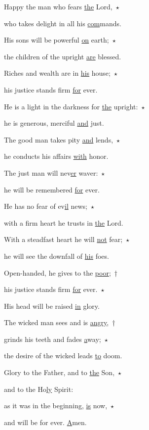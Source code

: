 \noindent Happy the man who fears \uline{the} Lord,~$\star$~\nopagebreak

who takes delight in all his \uline{com}mands.

\noindent His sons will be powerful \uline{on} earth;~$\star$~\nopagebreak

the children of the upright \uline{are} blessed.

\noindent Riches and wealth are in \uline{his} house;~$\star$~\nopagebreak

his justice stands firm \uline{for} ever.

\noindent He is a light in the darkness for \uline{the} upright:~$\star$~\nopagebreak

he is generous, merciful \uline{and} just.

\noindent The good man takes pity \uline{and} lends,~$\star$~\nopagebreak

he conducts his affairs \uline{with} honor.

\noindent The just man will nev\uline{er} waver:~$\star$~\nopagebreak

he will be remembered \uline{for} ever.

\noindent He has no fear of ev\uline{il} news;~$\star$~\nopagebreak

with a firm heart he trusts in \uline{the} Lord.

\noindent With a steadfast heart he will \uline{not} fear;~$\star$~\nopagebreak

he will see the downfall of \uline{his} foes.

\noindent Open-handed, he gives to the \uline{poor};~†~\nopagebreak

his justice stands firm \uline{for} ever.~$\star$~\nopagebreak

His head will be raised \uline{in} glory.

\noindent The wicked man sees and is \uline{angry},~†~\nopagebreak

grinds his teeth and fades \uline{a}way;~$\star$~\nopagebreak

the desire of the wicked leads \uline{to} doom.

\noindent Glory to the Father, and to \uline{the} Son,~$\star$~\nopagebreak

and to the Ho\uline{ly} Spirit:

\noindent as it was in the beginning, \uline{is} now,~$\star$~\nopagebreak

and will be for ever. \uline{A}men.
